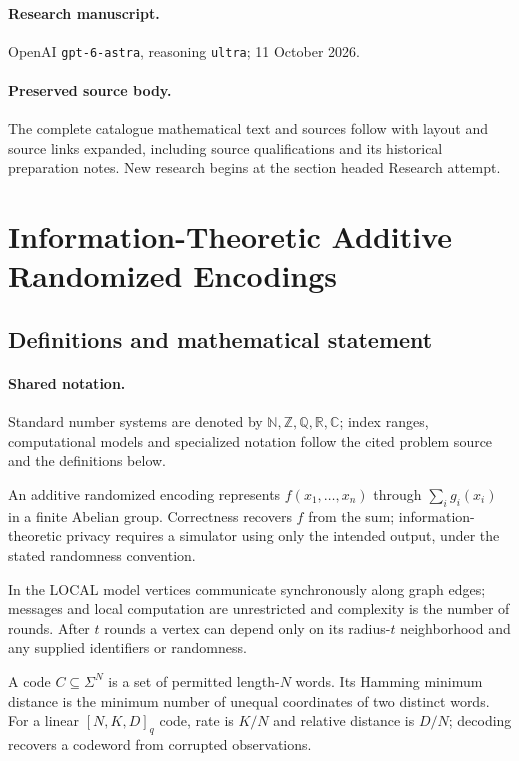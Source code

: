 \documentclass[11pt]{article}
\begin{document}
\paragraph{Research manuscript.} OpenAI \texttt{gpt-6-astra}, reasoning \texttt{ultra}; 11 October 2026.
\paragraph{Preserved source body.} The complete catalogue mathematical text and sources follow with layout and source links expanded, including source qualifications and its historical preparation notes. New research begins at the section headed Research attempt.

\section{Information-Theoretic Additive Randomized Encodings}\label{statement}

\subsection{Definitions and mathematical statement}

\paragraph{Shared notation.}Standard number systems are denoted by $\mathbb N,\mathbb Z,\mathbb Q,\mathbb R,\mathbb C$; index ranges, computational models and specialized notation follow the cited problem source and the definitions below.


An additive randomized encoding represents $f(x_1,\ldots,x_n)$ through $\sum_i g_i(x_i)$ in a finite Abelian group. Correctness recovers $f$ from the sum; information-theoretic privacy requires a simulator using only the intended output, under the stated randomness convention.

In the LOCAL model vertices communicate synchronously along graph edges; messages and local computation are unrestricted and complexity is the number of rounds. After $t$ rounds a vertex can depend only on its radius-$t$ neighborhood and any supplied identifiers or randomness.

A code $C\subseteq\Sigma^N$ is a set of permitted length-$N$ words. Its Hamming minimum distance is the minimum number of unequal coordinates of two distinct words. For a linear $[N,K,D]_q$ code, rate is $K/N$ and relative distance is $D/N$; decoding recovers a codeword from corrupted observations.
\end{document}
